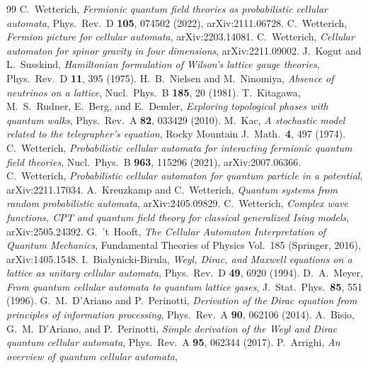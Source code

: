 \documentclass[aps,prd,twocolumn,superscriptaddress,nofootinbib,floatfix]{revtex4-2}
\begin{document}
\begin{thebibliography}{99}
 C.~Wetterich,
\emph{Fermionic quantum field theories as probabilistic cellular automata},
Phys.\ Rev.\ D \textbf{105}, 074502 (2022), arXiv:2111.06728.
 C.~Wetterich,
\emph{Fermion picture for cellular automata}, arXiv:2203.14081.
 C.~Wetterich,
\emph{Cellular automaton for spinor gravity in four dimensions},
arXiv:2211.09002.
 J.~Kogut and L.~Susskind,
\emph{Hamiltonian formulation of Wilson's lattice gauge theories},
Phys.\ Rev.\ D \textbf{11}, 395 (1975).
 H.~B.~Nielsen and M.~Ninomiya,
\emph{Absence of neutrinos on a lattice}, Nucl.\ Phys.\ B \textbf{185}, 20
(1981).
 T.~Kitagawa, M.~S.~Rudner, E.~Berg, and E.~Demler,
\emph{Exploring topological phases with quantum walks},
Phys.\ Rev.\ A \textbf{82}, 033429 (2010).
 M.~Kac,
\emph{A stochastic model related to the telegrapher's equation},
Rocky Mountain J.\ Math.\ \textbf{4}, 497 (1974).
 C.~Wetterich,
\emph{Probabilistic cellular automata for interacting fermionic quantum
field theories}, Nucl.\ Phys.\ B \textbf{963}, 115296 (2021),
arXiv:2007.06366.
 C.~Wetterich,
\emph{Probabilistic cellular automaton for quantum particle in a
potential}, arXiv:2211.17034.
 A.~Kreuzkamp and C.~Wetterich,
\emph{Quantum systems from random probabilistic automata},
arXiv:2405.09829.
 C.~Wetterich,
\emph{Complex wave functions, CPT and quantum field theory for classical
generalized Ising models}, arXiv:2505.24392.
 G.~'t~Hooft,
\emph{The Cellular Automaton Interpretation of Quantum Mechanics},
Fundamental Theories of Physics Vol.~185 (Springer, 2016),
arXiv:1405.1548.
 I.~Bia{\l}ynicki-Birula,
\emph{Weyl, Dirac, and Maxwell equations on a lattice as unitary cellular
automata}, Phys.\ Rev.\ D \textbf{49}, 6920 (1994).
 D.~A.~Meyer,
\emph{From quantum cellular automata to quantum lattice gases},
J.\ Stat.\ Phys.\ \textbf{85}, 551 (1996).
 G.~M.~D'Ariano and P.~Perinotti,
\emph{Derivation of the Dirac equation from principles of information
processing}, Phys.\ Rev.\ A \textbf{90}, 062106 (2014).
 A.~Bisio, G.~M.~D'Ariano, and P.~Perinotti,
\emph{Simple derivation of the Weyl and Dirac quantum cellular automata},
Phys.\ Rev.\ A \textbf{95}, 062344 (2017).
 P.~Arrighi,
\emph{An overview of quantum cellular automata},

\end{thebibliography}
\end{document}
